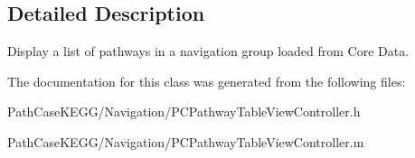 \subsection{Detailed Description}
Display a list of pathways in a navigation group loaded from Core Data. 

The documentation for this class was generated from the following files:\begin{DoxyCompactItemize}
\item 
PathCaseKEGG/Navigation/PCPathwayTableViewController.h\item 
PathCaseKEGG/Navigation/PCPathwayTableViewController.m\end{DoxyCompactItemize}
